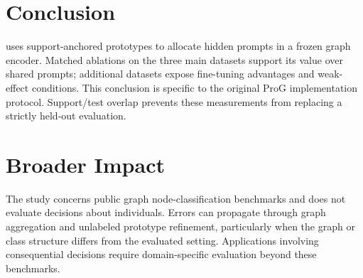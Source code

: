 \section{Conclusion}
\method{} uses support-anchored prototypes to allocate hidden prompts in a frozen graph encoder. Matched ablations on the three main datasets support its value over shared prompts; additional datasets expose fine-tuning advantages and weak-effect conditions. This conclusion is specific to the original ProG implementation protocol. Support/test overlap prevents these measurements from replacing a strictly held-out evaluation.

\section*{Broader Impact}
The study concerns public graph node-classification benchmarks and does not evaluate decisions about individuals. Errors can propagate through graph aggregation and unlabeled prototype refinement, particularly when the graph or class structure differs from the evaluated setting. Applications involving consequential decisions require domain-specific evaluation beyond these benchmarks.
